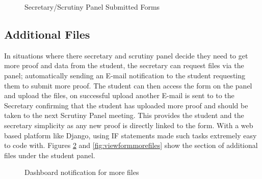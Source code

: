 \documentclass[../main.tex]{subfiles}
\begin{document}
\begin{figure}[H]
        \caption{\label{fig:ecfsectable} Secretary/Scrutiny Panel Submitted Forms}
      \end{figure}

\subsection*{Additional Files}
In situations where there secretary and scrutiny panel decide they need to get more proof and data from the student, the secretary can request files via the panel; automatically sending an E-mail notification to the student requesting them to submit more proof. The student can then access the form on the panel and upload the files, on successful upload another E-mail is sent to to the Secretary confirming that the student has uploaded more proof and should be taken to the next Scrutiny Panel meeting. This provides the student and the secretary simplicity as any new proof is directly linked to the form. With a web based platform like Django, using IF statements made such tasks extremely easy to code with. Figures \ref{fig:dashboardmorefiles} and \ref{fig:viewformmorefiles} show the section of additional files under the student panel. 

\begin{figure}[H]
        \caption{\label{fig:dashboardmorefiles} Dashboard notification for more files}
      \end{figure}
      
\end{document}
